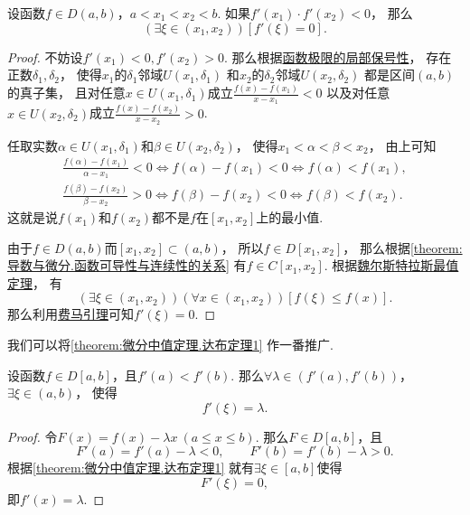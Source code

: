 \begin{theorem}[达布零点定理]\label{theorem:微分中值定理.达布定理1}
设函数\(f \in D(a,b)\)，\(a<x_1<x_2<b\).
如果\(f'(x_1) \cdot f'(x_2) < 0\)，
那么\[
	(\exists\xi\in(x_1,x_2))
	[f'(\xi) = 0].
\]
\begin{proof}
不妨设\(f'(x_1)<0,f'(x_2)>0\).
那么根据\hyperref[theorem:极限.函数极限的局部保号性1]{函数极限的局部保号性}，
存在正数\(\delta_1,\delta_2\)，
使得\(x_1\)的\(\delta_1\)邻域\(U(x_1,\delta_1)\)
和\(x_2\)的\(\delta_2\)邻域\(U(x_2,\delta_2)\)
都是区间\((a,b)\)的真子集，
且对任意\(x \in U(x_1,\delta_1)\)成立\(\frac{f(x)-f(x_1)}{x-x_1}<0\)
以及对任意\(x \in U(x_2,\delta_2)\)成立\(\frac{f(x)-f(x_2)}{x-x_2}>0\).

任取实数\(\alpha \in U(x_1,\delta_1)\)和\(\beta \in U(x_2,\delta_2)\)，
使得\(x_1<\alpha<\beta<x_2\)，
由上可知\[
	\begin{split}
		\frac{f(\alpha)-f(x_1)}{\alpha-x_1}<0
		\iff
		f(\alpha)-f(x_1)<0
		\iff
		f(\alpha)<f(x_1), \\
		\frac{f(\beta)-f(x_2)}{\beta-x_2}>0
		\iff
		f(\beta)-f(x_2)<0
		\iff
		f(\beta)<f(x_2).
	\end{split}
\]
这就是说\(f(x_1)\)和\(f(x_2)\)都不是\(f\)在\([x_1,x_2]\)上的最小值.

由于\(f \in D(a,b)\)而\([x_1,x_2]\subset(a,b)\)，
所以\(f \in D[x_1,x_2]\)，
那么根据\cref{theorem:导数与微分.函数可导性与连续性的关系}
有\(f \in C[x_1,x_2]\).
根据\hyperref[theorem:极限.最值定理]{魏尔斯特拉斯最值定理}，
有\[
	(\exists\xi\in(x_1,x_2))
	(\forall x\in(x_1,x_2))
	[f(\xi) \leq f(x)].
\]
那么利用\hyperref[theorem:微分中值定理.费马引理]{费马引理}可知\(f'(\xi)=0\).
\end{proof}
\end{theorem}

我们可以将\cref{theorem:微分中值定理.达布定理1} 作一番推广.
\begin{theorem}[达布介值定理]\label{theorem:微分中值定理.达布定理2}
设函数\(f \in D[a,b]\)，且\(f'(a) < f'(b)\).
那么\(\forall\lambda\in(f'(a),f'(b))\)，\(\exists\xi\in(a,b)\)，
使得\[
	f'(\xi) = \lambda.
\]
\begin{proof}
令\(F(x) = f(x) - \lambda x\ (a \leq x \leq b)\).
那么\(F \in D[a,b]\)，且\[
	F'(a) = f'(a) - \lambda < 0, \qquad
	F'(b) = f'(b) - \lambda > 0.
\]
根据\cref{theorem:微分中值定理.达布定理1} 就有\(\exists\xi\in[a,b]\)使得\[
	F'(\xi)=0,
\]
即\(f'(x) = \lambda\).
\end{proof}
\end{theorem}

